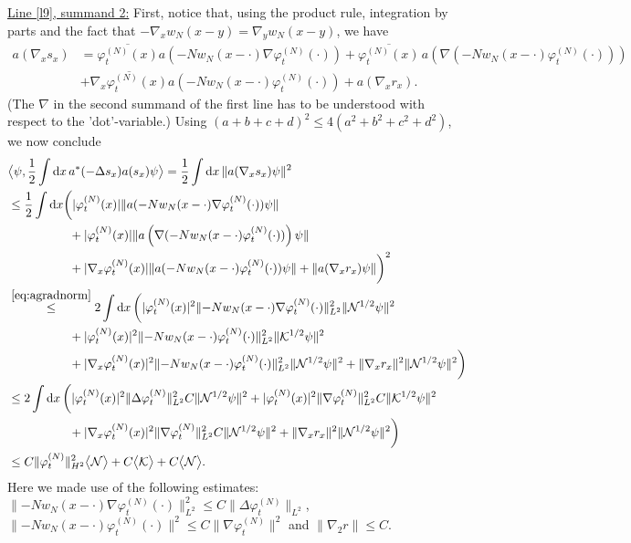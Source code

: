 \documentclass[11pt,a4paper,draft,DIV11]{scrartcl}	%
\newcommand{\di}{\textrm{d}}		%
\newcommand{\Ncal}{\mathcal{N}}		%
\newcommand{\Kcal}{\mathcal{K}}		%
\newcommand{\estlist}[2]{\underline{Line \ref{l#1}, summand #2:}}
\newcommand{\scal}[2]{\big<#1,#2\big>} %
\newcommand{\cc}[1]{\overline{#1}}	%
\newcommand{\norm}[1]{\lVert#1\rVert}	%
\newcommand{\ev}[1]{\big<#1\big>}	%
\newcommand{\ph}{\varphi_t^{(N)}}	%
\newcommand{\gradone}{\nabla_2}
\newcommand{\eqr}[1]{\eqref{eq:#1}}			%
\begin{document}
\estlist{9}{2}
First, notice that, using the product rule, integration by parts and the fact that $-\nabla_x w_N(x-y) = \nabla_y w_N(x-y)$, we have
\begin{align*}
 a(\nabla_x s_x) & = \cc{\ph(x)} a(-Nw_N(x-\cdot)\nabla\ph(\cdot)) + \cc{\ph(x)}\,a\left(\nabla(-N w_N(x-\cdot)\ph(\cdot))\right) \\
 & + \cc{\nabla_x \ph(x)} a(-Nw_N(x-\cdot)\ph(\cdot)) + a(\nabla_x r_x).
\end{align*}
(The $\nabla$ in the second summand of the first line has to be understood with respect to the 'dot'-variable.)
Using $(a+b+c+d)^2 \leq 4(a^2+b^2+c^2+d^2)$, we now conclude
\begin{equation}
\label{eq:bound2B}
\begin{split}
 & \scal{\psi}{\frac{1}{2}\int \di x\, a^\ast(-\Delta s_x) a(s_x)\psi} = \frac{1}{2}\int \di x\, \norm{a(\nabla_x s_x)\psi}^2 \\
& \leq \frac{1}{2} \int \di x \bigg( \lvert \ph(x)\rvert \norm{a(-Nw_N(x-\cdot)\nabla\ph(\cdot))\psi} \\
& \qquad\qquad\quad + \lvert \ph(x)\rvert \norm{a\left(\nabla(-N w_N(x-\cdot)\ph(\cdot))\right)\psi} \\
& \qquad\qquad\quad + \lvert \nabla_x \ph(x)\rvert \norm{a(-Nw_N(x-\cdot)\ph(\cdot))\psi} + \norm{a(\nabla_x r_x)\psi}  \bigg)^2 \\
& \stackrel{\eqr{agradnorm}}{\leq} 2\int \di x\, \bigg( \lvert \ph(x)\rvert^2 \norm{-N w_N(x-\cdot)\nabla\ph(\cdot)}_{L^2}^2 \norm{\Ncal^{1/2}\psi}^2  \\
& \qquad\qquad\quad + \lvert \ph(x)\rvert^2 \norm{-Nw_N(x-\cdot) \ph(\cdot)}_{L^2}^2 \norm{\Kcal^{1/2}\psi}^2  \\
& \qquad\qquad\quad + \lvert \nabla_x \ph(x)\rvert^2 \norm{-N w_N(x-\cdot) \ph(\cdot)}_{L^2}^2 \norm{\Ncal^{1/2}\psi}^2 + \norm{\nabla_x r_x}^2 \norm{\Ncal^{1/2}\psi}^2 \bigg) \\
& \leq 2 \int \di x\, \bigg( \lvert \ph(x)\rvert^2 \norm{\Delta \ph}_{L^2}^2 C \norm{\Ncal^{1/2}\psi}^2 + \lvert \ph(x)\rvert^2 \norm{\nabla \ph}_{L^2}^2 C \norm{\Kcal^{1/2}\psi}^2 \\
& \qquad\qquad\quad + \lvert \nabla_x \ph(x)\rvert^2 \norm{\nabla \ph}_{L^2}^2 C \norm{\Ncal^{1/2}\psi}^2 + \norm{\nabla_x r_x}^2 \norm{\Ncal^{1/2}\psi}^2 \bigg)\\
& \leq C \norm{\ph}_{H^2}^2 \ev{\Ncal} + C\ev{\Kcal} + C\ev{\Ncal}.
\end{split} 
\end{equation}
Here we made use of the following estimates: $\norm{-N w_N(x-\cdot) \nabla\ph(\cdot)}_{L^2}^2 \leq C\norm{\Delta \ph}_{L^2}$, $\norm{-N w_N(x-\cdot)\ph(\cdot)}^2 \leq C \norm{\nabla \ph}^2$  and $ \norm{\gradone r} \leq C$.
\end{document}
